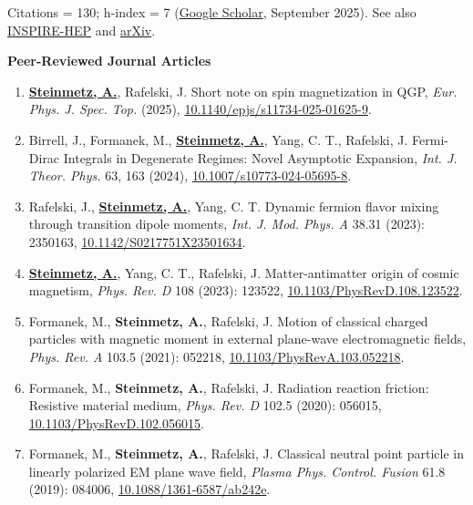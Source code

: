 \documentclass[11pt]{article}
\begin{document}
Citations = 130; h-index = 7 (\href{https://scholar.google.com/citations?user=fJBK1GIAAAAJ}{Google Scholar}, September 2025). See also \href{https://inspirehep.net/authors/1796313}{INSPIRE-HEP} and \href{https://arxiv.org/a/steinmetz_a_1.html}{arXiv}.

{\large\textbf{Peer-Reviewed Journal Articles}}

\begin{enumerate}[leftmargin=*,nosep]
    \item \textbf{\href{https://github.com/ajsteinmetz/short-note-qgp}{Steinmetz, A.}}, Rafelski, J. Short note on spin magnetization in QGP, \textit{Eur. Phys. J. Spec. Top.} (2025), \href{https://doi.org/10.1140/epjs/s11734-025-01625-9}{10.1140/epjs/s11734-025-01625-9}.
    \item Birrell, J., Formanek, M., \textbf{\href{https://github.com/ajsteinmetz/fermi-distribution}{Steinmetz, A.}}, Yang, C. T., Rafelski, J. Fermi-Dirac Integrals in Degenerate Regimes: Novel Asymptotic Expansion, \textit{Int. J. Theor. Phys.} 63, 163 (2024), \href{https://doi.org/10.1007/s10773-024-05695-8}{10.1007/s10773-024-05695-8}.
    \item Rafelski, J., \textbf{\href{https://github.com/ajsteinmetz/neutrino-transition-moments}{Steinmetz, A.}}, Yang, C. T. Dynamic fermion flavor mixing through transition dipole moments, \textit{Int. J. Mod. Phys. A} 38.31 (2023): 2350163, \href{https://doi.org/10.1142/S0217751X23501634}{10.1142/S0217751X23501634}.
    \item \textbf{\href{https://github.com/ajsteinmetz/plasma-partition}{Steinmetz, A.}}, Yang, C. T., Rafelski, J. Matter-antimatter origin of cosmic magnetism, \textit{Phys. Rev. D} 108 (2023): 123522, \href{https://doi.org/10.1103/PhysRevD.108.123522}{10.1103/PhysRevD.108.123522}.
    \item Formanek, M., \textbf{Steinmetz, A.}, Rafelski, J. Motion of classical charged particles with magnetic moment in external plane-wave electromagnetic fields, \textit{Phys. Rev. A} 103.5 (2021): 052218, \href{https://doi.org/10.1103/PhysRevA.103.052218}{10.1103/PhysRevA.103.052218}.
    \item Formanek, M., \textbf{Steinmetz, A.}, Rafelski, J. Radiation reaction friction: Resistive material medium, \textit{Phys. Rev. D} 102.5 (2020): 056015, \href{https://doi.org/10.1103/PhysRevD.102.056015}{10.1103/PhysRevD.102.056015}.
    \item Formanek, M., \textbf{Steinmetz, A.}, Rafelski, J. Classical neutral point particle in linearly polarized EM plane wave field, \textit{Plasma Phys. Control. Fusion} 61.8 (2019): 084006, \href{https://doi.org/10.1088/1361-6587/ab242e}{10.1088/1361-6587/ab242e}.

\end{enumerate}
\end{document}
